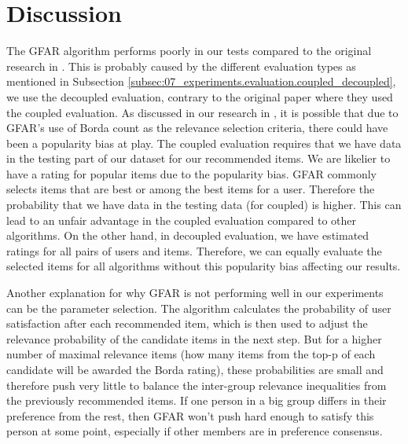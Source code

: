 \section{Discussion} \label{sec:experiments.discussion}

The GFAR algorithm performs poorly in our tests compared to the original research in \cite{GFAR-kaya2020}. This is probably caused by the different evaluation types as mentioned in Subsection \ref{subsec:07_experiments.evaluation.coupled_decoupled}, we use the decoupled evaluation, contrary to the original paper where they used the coupled evaluation. As discussed in our research in \cite{peska2021coupled}, it is possible that due to GFAR's use of Borda count as the relevance selection criteria, there could have been a popularity bias at play. The coupled evaluation requires that we have data in the testing part of our dataset for our recommended items. We are likelier to have a rating for popular items due to the popularity bias. GFAR commonly selects items that are best or among the best items for a user. Therefore the probability that we have data in the testing data (for coupled) is higher. This can lead to an unfair advantage in the coupled evaluation compared to other algorithms. On the other hand, in decoupled evaluation, we have estimated ratings for all pairs of users and items. Therefore, we can equally evaluate the selected items for all algorithms without this popularity bias affecting our results.

Another explanation for why GFAR is not performing well in our experiments can be the parameter selection. The algorithm calculates the probability of user satisfaction after each recommended item, which is then used to adjust the relevance probability of the candidate items in the next step. But for a higher number of maximal relevance items (how many items from the top-p of each candidate will be awarded the Borda rating), these probabilities are small and therefore push very little to balance the inter-group relevance inequalities from the previously recommended items. If one person in a big group differs in their preference from the rest, then GFAR won't push hard enough to satisfy this person at some point, especially if other members are in preference consensus.

